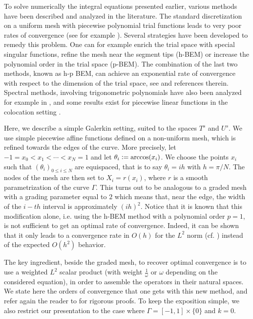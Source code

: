 \documentclass[a4paper]{subfiles}
\begin{document}
\label{subsec:GalerkinSetting}
To solve numerically the integral equations presented earlier, various methods have been described and analyzed in the literature. 
The standard discretization on a uniform mesh with piecewise polynomial trial functions leads to very poor rates of convergence (see 
for example \cite[Chap. 4]{sauter2011boundary}). Several strategies have been developed to remedy this problem. One can for example 
enrich the trial space with special singular functions, refine the mesh near the segment tips (h-BEM) or increase the polynomial order 
in the trial space (p-BEM). The combination of the last two methods, known as h-p BEM, can achieve an exponential rate of convergence 
with respect to the dimension of the trial space, see \cite{postell1990h} and references therein. Spectral methods, involving trigonometric 
polynomials have also been analyzed for example in \cite{bruno2012second}, and some results exist for piecewise linear functions in the 
colocation setting \cite{costabel1988convergence}. 

Here, we describe a simple Galerkin setting, suited to the spaces $T^s$ and $U^s$. We use simple piecewise affine functions defined on 
a non-uniform mesh, which is refined towards the edges of the curve. More precisely, let
$-1 = x_0 < x_1 < \cdots < x_N = 1$ and let $\theta_i \mathrel{\mathop:}= \arccos(x_i)$. We choose the points $x_i$ such that $(\theta_i)_{0\leq i\leq N}$ 
are equispaced, that is to say $\theta_i = ih$ with $h = \pi/N$. The nodes of the mesh are then set to $X_i = r(x_i)$, where $r$ is a smooth 
parametrization of the curve $\Gamma$. This turns out to be analogous to a graded mesh with a grading parameter equal to $2$ which 
means that, near the edge, the width of the $i-th$ interval is approximately $(ih)^2$. Notice that it is known 
that this modification alone, i.e. using the h-BEM method with a polynomial order $p=1$, is not sufficient to get an optimal rate of convergence.
Indeed, it can be shown that it only leads to a convergence rate in $O(h)$ for the $L^2$ norm 
(cf. \cite[Theorem 1.3]{postell1990h}) instead of the expected $O(h^2)$ behavior. 

The key ingredient, beside the graded mesh, to recover optimal convergence is to use a weighted $L^2$ scalar product 
(with weight  $\frac{1}{\omega}$ or $\omega$ depending on the considered equation), in order to assemble the operators in their natural spaces. 
We state here the orders of convergence that one gets with this new method, and refer again the reader to \cite{averseng} for rigorous proofs. To 
keep the exposition simple, we also restrict our presentation to the case where $\Gamma = [-1,1]\times\{0\}$ and $k = 0$. 
\end{document}
